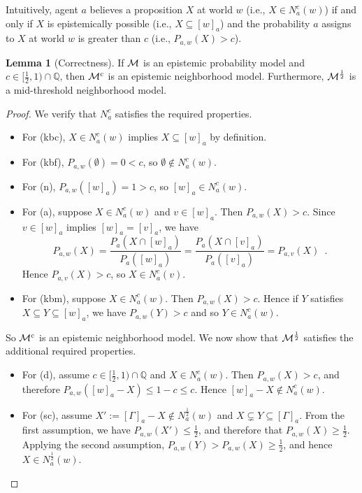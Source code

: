 \documentclass[12pt]{article}
\theoremstyle{definition}
\newtheorem{lemma}[theorem]{Lemma}
\newcommand{\Rat}{\mathbb{Q}}  %
\newcommand{\M}{{\cal M}}      %
\begin{document}
Intuitively, agent $a$ believes a proposition $X$ at world $w$ (i.e., $X\in N^c_a(w)$) if and
only if $X$ is epistemically possible (i.e., $X\subseteq[w]_a$) and
the probability $a$ assigns to $X$ at world $w$ is greater than $c$ (i.e.,
$P_{a,w}(X)>c$).

\begin{lemma}[Correctness]
  \label{lemma:correctness}
  If $\M$ is an epistemic probability model and $c\in[\frac
  12,1)\cap\Rat$, then $\M^c$ is an epistemic neighborhood model.
  Furthermore, $\M^{\frac 12}$ is a mid-threshold neighborhood model.
\end{lemma}
\begin{proof}
  We verify that $N^c_a$ satisfies the required properties.
  \begin{itemize}
  \item For (kbc), $X\in N^c_a(w)$ implies $X\subseteq[w]_a$ by
    definition.

  \item For (kbf), $P_{a,w}(\emptyset)=0<c$, so $\emptyset\notin N^c_a(w)$.

  \item For (n), $P_{a,w}([w]_a) = 1 > c$, so
    $[w]_a \in N^c_a(w)$.

  \item For (a), suppose $X \in N^c_a(w)$ and $v\in [w]_a$.  Then
    $P_{a,w}(X)>c$.  Since $v\in [w]_a$ implies $[w]_a = [v]_a$, we
    have
    \[
    P_{a,w}(X) = 
    \frac{P_a(X\cap[w]_a)}{P_a([w]_a)} =
    \frac{P_a(X\cap[v]_a)}{P_a([v]_a)} =
    P_{a,v}(X) \enspace.
    \]
    Hence $P_{a,v}(X)>c$, so $X \in N^c_a(v)$.

  \item For (kbm), suppose $X \in N^c_a(w)$.  Then $P_{a,w}(X)>c$.
    Hence if $Y$ satisfies $X \subseteq Y \subseteq [w]_a$, we have
    $P_{a,w}(Y)>c$ and so $Y \in N^c_a(w)$.
  \end{itemize}
  So $\M^c$ is an epistemic neighborhood model.  We now show that
  $\M^{\frac 12}$ satisfies the additional required properties.
  \begin{itemize}
  \item For (d), assume $c\in[\frac 12,1)\cap\Rat$ and $X \in
    N^c_a(w)$.  Then $P_{a,w}(X) > c$, and therefore $P_{a,w}([w]_a -
    X) \leq 1-c\leq c$. Hence $[w]_a - X \notin N^c_a(w)$.

  \item For (sc), assume $X':=[\Gamma]_a-X\notin N^{\frac 12}_a(w)$
    and $X\subsetneq Y\subseteq[\Gamma]_a$.  From the first
    assumption, we have $P_{a,w}(X') \leq \frac 12$, and therefore
    that $P_{a,w}(X)\geq \frac 12$.  Applying the second assumption,
    $P_{a,w}(Y) > P_{a,w}(X)\geq \frac 12$, and hence $X\in N^{\frac
      12}_a(w)$.


\end{itemize}
\end{proof}
\end{document}
